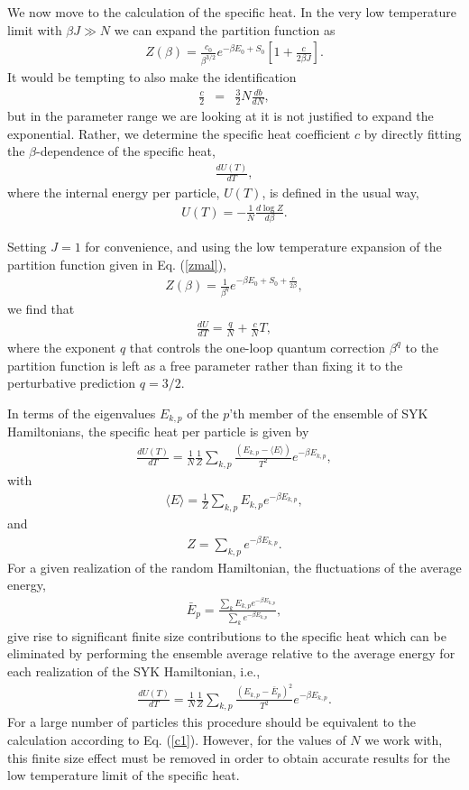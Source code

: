 \documentclass[aps,showpacs,floatfix,superscriptaddress,pre,11pt]{revtex4-1}
\newcommand{\eref}[1]{(\ref{#1})}
\newcommand{\be}{\begin{eqnarray}}
\newcommand{\ee}{\end{eqnarray}}
\begin{document}
We now move to the calculation of the specific heat. 
In the very
low temperature limit with $\beta J \gg N$ we can expand the partition
function as
\be
Z(\beta) = \frac {c_0}{\beta^{3/2}} e^{-\beta E_0 + S_0}\left[1 + \frac c{2\beta J}\right].
\ee
It would be tempting to also make  the identification
\be
\frac c{2 } &=& \frac 32 N \frac {db}{dN}, \nonumber
\label{S0d}
\ee
but in the parameter range we are looking at it is not justified to
expand the exponential. Rather, we determine the specific heat coefficient $c$
by directly fitting the $\beta$-dependence of the specific heat, 
 \be
\frac {dU(T)}{dT},
 \ee
where the internal energy per particle, $U(T)$, is defined in the usual way,
 \be
 U(T) = -\frac 1N \frac {d\log Z}{d \beta}.
 \ee

 Setting $J = 1$ for convenience, and using the low temperature expansion of the partition function given in
 Eq. \eref{zmal},
 \be \label{partq}
 Z(\beta) = \frac 1{\beta^q} e^{-\beta E_0 +S_0 + \frac c{2\beta}},
   \ee
    we find that
   \be
   \frac{dU}{dT} = \frac qN + \frac cN T,
   \ee
where the exponent $q$ that controls the one-loop quantum correction $\beta^{q}$ to the partition function is left as a free parameter rather than fixing it to the perturbative \cite{kitaev2015,maldacena2016} prediction $ q= 3/2$. 

 In terms of the eigenvalues $E_{k,p}$ of the $p$'th
 member of the ensemble of SYK Hamiltonians, the specific heat per particle
 is given
 by
\be
\frac {dU(T)}{dT} = \frac 1{N} \frac 1Z \sum_{k,p} \frac{(E_{k,p} - \langle E\rangle)}{T^2}e^{-\beta E_{k,p}},
\label{c1}
  \ee
 with
 \be
 \langle E \rangle  = \frac 1{Z }\sum_{k,p} E_{k,p} e^{-\beta E_{k,p}},
 \ee
 and
 \be
Z  = \sum_{k,p}e^{-\beta E_{k,p}}.
 \ee
 For a given realization of the random Hamiltonian, the fluctuations of the average energy, 
 \be
 \bar E_p =\frac{ \sum_{k} E_{k,p} e^{-\beta E_{k,p}}}{ \sum_{k}  e^{-\beta E_{k,p}}},
 \ee
give rise to significant
finite size contributions to the specific heat  which can be eliminated by performing the ensemble average relative to the average energy for each
realization of the SYK Hamiltonian, i.e.,
\be
\frac {dU(T)}{dT} = \frac 1{N}\frac 1Z \sum_{k,p} \frac{(E_{k,p} - \bar E_p )^2}{T^2}e^{-\beta E_{k,p}}.
\label{c2}
 \ee
 For a large number of particles this procedure should be equivalent to the calculation according to Eq. \eref{c1}.
However, for the values of $N$ we work with, this  finite size effect must be removed in order to obtain accurate results for the low temperature limit of the
specific heat.
\end{document}
